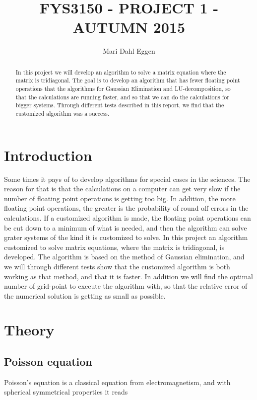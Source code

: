 \documentclass[12pt]{article}
\begin{document}
\title{FYS3150 - PROJECT 1 - AUTUMN 2015}
\author{Mari Dahl Eggen}
\maketitle

\newpage

\begin{flushleft}
\begin{abstract}
In this project we will develop an algorithm to solve a matrix equation where the matrix is tridiagonal. The goal is to develop an algorithm that has fewer floating point operations that the algorithms for Gaussian Elimination and LU-decomposition, so that the calculations are running faster, and so that we can do the calculations for bigger systems. Through different tests described in this report, we find that the customized algorithm was a success.
\end{abstract}
\section*{Introduction}
Some times it pays of to develop algorithms for special cases in the sciences. The reason for that is that the calculations on a computer can get very slow if the number of floating point operations is getting too big. In addition, the more floating point operations, the greater is the probability of round off errors in the calculations. If a customized algorithm is made, the floating point operations can be cut down to a minimum of what is needed, and then the algorithm can solve grater systems of the kind it is customized to solve. In this project an algorithm customized to solve matrix equations, where the matrix is tridiagonal, is developed. The algorithm is based on the method of Gaussian elimination, and we will through different tests show that the customized algorithm is both working as that method, and that it is faster. In addition we will find the optimal number of grid-point to execute the algorithm with, so that the relative error of the numerical solution is getting as small as possible.


\newpage
\section*{Theory}
\subsection*{Poisson equation}
Poisson's equation is a classical equation from electromagnetism, and with spherical symmetrical properties it reads\\


\end{flushleft}
\end{document}
